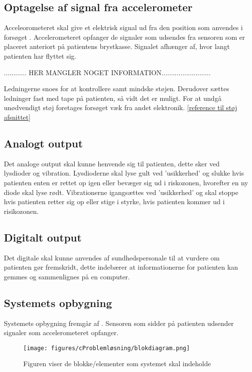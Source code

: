 \subsection{Optagelse af signal fra accelerometer}
Acceleorometeret skal give et elektrisk signal ud fra den position som anvendes i forsøget . Accelerometeret opfanger de signaler som udsendes fra sensoren som er placeret anteriort på patientens brystkasse. Signalet afhænger af, hvor langt patienten har flyttet sig. 

............ HER MANGLER NOGET INFORMATION..........................

Ledningerne snoes for at kontrollere samt mindske støjen. Derudover sættes ledninger fast med tape på patienten, så vidt det er muligt. For at undgå unødvendigt støj foretages forsøget væk fra andet elektronik.  \ref{reference til støj afsnittet}



\subsection{Analogt output}
Det analoge output skal kunne henvende sig til patienten, dette sker ved lysdioder og vibration. Lysdioderne skal lyse gult ved 'usikkerhed' og slukke hvis patienten enten er rettet op igen eller bevæger sig ud i riskozonen, hvorefter en ny diode skal lyse rødt. Vibrationerne igangsættes ved 'usikkerhed' og skal stoppe hvis patienten retter sig op eller stige i styrke, hvis patienten kommer ud i risikozonen. 

\subsection{Digitalt output}
Det digitale skal kunne anvendes af sundhedspersonale til at vurdere om patienten gør fremskridt, dette indebærer at informationerne for patienten kan gemmes og sammenlignes på en computer. 


\subsection{Systemets opbygning}
Systemets opbygning fremgår af . Sensoren som sidder på patienten udsender signaler som accelerometeret opfanger.

\begin{figure}[H]
	\centering
	\texttt{[image: figures/cProblemløsning/blokdiagram.png]}
	\caption{Figuren viser de blokke/elementer som systemet skal indeholde}
	\label{krav_blok}
\end{figure}

